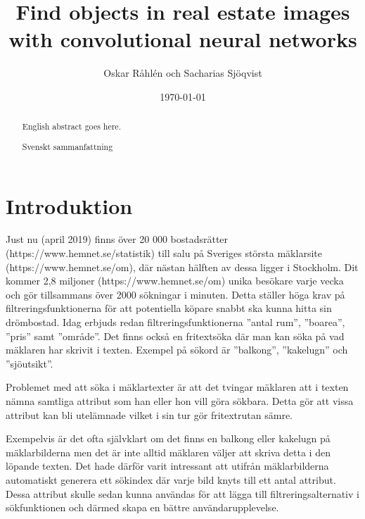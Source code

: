 \documentclass{kththesis}
\title{Find objects in real estate images with convolutional neural networks}
\author{Oskar Råhlén och Sacharias Sjöqvist}
\date{\today}
\begin{document}
\frontmatter

\titlepage

\begin{abstract}
  English abstract goes here.
\end{abstract}

\begin{otherlanguage}{swedish}
  \begin{abstract}
    Svenskt sammanfattning
  \end{abstract}
\end{otherlanguage}

\tableofcontents

\mainmatter


\chapter{Introduktion}

Just nu (april 2019) finns över 20 000 bostadsrätter (https://www.hemnet.se/statistik) till salu på Sveriges största mäklarsite (https://www.hemnet.se/om), där nästan hälften av dessa ligger i Stockholm. 
Dit kommer 2,8 miljoner (https://www.hemnet.se/om) unika besökare varje vecka och gör tillsammans över 2000 sökningar i minuten.
Detta ställer höga krav på filtreringsfunktionerna för att potentiella köpare snabbt ska kunna hitta sin drömbostad.
Idag erbjuds redan filtreringsfunktionerna ”antal rum”, ”boarea”, ”pris” samt ”område”. 
Det finns också en fritextsöka där man kan söka på vad mäklaren har skrivit i texten.
Exempel på sökord är ”balkong”, ”kakelugn” och ”sjöutsikt”. 

Problemet med att söka i mäklartexter är att det tvingar mäklaren att i texten nämna samtliga attribut som han eller hon vill göra sökbara. 
Detta gör att vissa attribut kan bli utelämnade vilket i sin tur gör fritextrutan sämre.

Exempelvis är det ofta självklart om det finns en balkong eller kakelugn på mäklarbilderna men det är inte alltid mäklaren väljer att skriva detta i den löpande texten.
Det hade därför varit intressant att utifrån mäklarbilderna automatiskt generera ett sökindex där varje bild knyts till ett antal attribut.
Dessa attribut skulle sedan kunna användas för att lägga till filtreringsalternativ i sökfunktionen och därmed skapa en bättre användarupplevelse.
\end{document}
